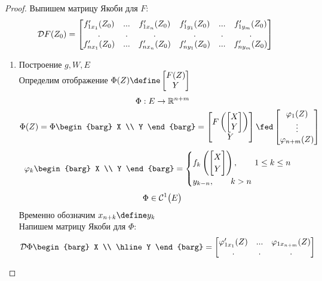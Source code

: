 \begin{proof}
	Выпишем матрицу Якоби для $ F $:
	$$ \mc{D}F(Z_0) =
	\begin{bmatrix}
		f_{1x_1}'(Z_0) & ... & f_{1x_n}'(Z_0) & f_{1y_1}'(Z_0) & ... & f_{1y_m}'(Z_0) \\
		. & . & . & . & . & . \\
		f_{nx_1}'(Z_0) & ... & f_{nx_n}'(Z_0) & f_{ny_1}'(Z_0) & ... & f_{ny_m}'(Z_0)
	\end{bmatrix} $$
	\begin{enumerate}
		\item Построение $ g, W, E $ \\
		Определим отображение $ \Phi(Z) \define
		\begin{bmatrix}
			F(Z) \\
			Y
		\end{bmatrix} $
		$$ \Phi : E \to \R^{n + m} $$
		$$ \Phi(Z) = \Phi
		\begin{barg}
			X \\
			Y
		\end{barg} =
		\begin{bmatrix}
			F \left(
			\begin{bmatrix}
				X \\
				Y
			\end{bmatrix} \right) \\
			Y
		\end{bmatrix} \fed \column{\vphi_1(Z)}{\vphi_{n + m}(Z)} $$
		$$ \vphi_k
		\begin{barg}
			X \\
			Y
		\end{barg} =
		\begin{cases}
			f_k \left(
		\begin{bmatrix}
			X \\
			Y
		\end{bmatrix} \right), \qquad 1 \le k \le n \\
			y_{k - n}, \qquad k > n
		\end{cases} $$
		$$ \Phi \in \Cont[1]{E} $$
		Временно обозначим $ x_{n + k} \define y_k $ \\
		Напишем матрицу Якоби для $ \Phi $:
		$$ \mc{D}\Phi
		\begin{barg}
			X \\
			\hline
			Y
		\end{barg} =
		\begin{bmatrix}
			\vphi_{1x_1}'(Z) & ... & \vphi_{1x_{n + m}}(Z) \\
			. & . & . \\

\end{bmatrix}$$
\end{enumerate}
\end{proof}
